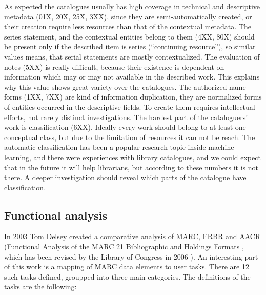 As expected the catalogues usually has high coverage in technical and descriptive metadata (01X, 20X, 25X, 3XX), since they are semi-automatically created, or their creation require less resources than that of the contextual metadata. The series statement, and the contextual entities belong to them (4XX, 80X) should be present only if the described item is series (``continuing resource''), so similar values means, that serial statements are mostly contextualized. The evaluation of notes (5XX) is really difficult, because their existence is dependent on information which may or may not available in the described work. This explains why this value shows great variety over the catalogues. The authorized name forms (1XX, 7XX) are kind of information duplication, they are normalized forms of entities occurred in the descriptive fields. To create them requires intellectual efforts, not rarely distinct investigations. The hardest part of the cataloguers' work is classification (6XX). Ideally every work should belong to at least one conceptual class, but due to the limitation of resources it can not be reach. The automatic classification has been a popular research topic inside machine learning, and there were experiences with library catalogues, and we could expect that in the future it will help librarians, but according to these numbers it is not there. A deeper investigation should reveal which parts of the catalogue have classification.

\subsection{Functional analysis}

In 2003 Tom Delsey created a comparative analysis of MARC, FRBR and AACR (Functional Analysis of the MARC 21 Bibliographic and Holdings Formats \cite{delsey2003}, which has been revised by the Library of Congress in 2006 \cite{loc2006}). An interesting part of this work is a mapping of MARC data elements to user tasks. There are 12 such tasks defined, groupped into three main categories. The definitions of the tasks are the following:


